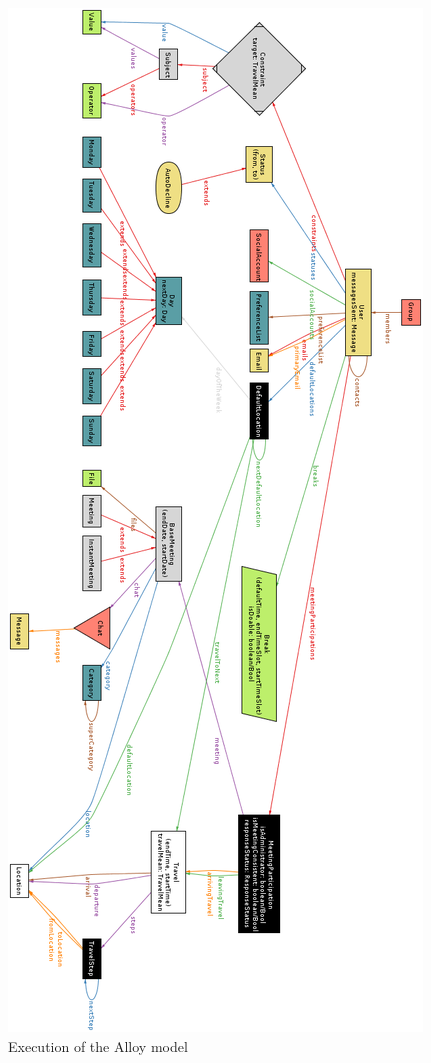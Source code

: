 \begin{figure}
	\vspace*{-0.5cm}
	\centering\includegraphics[height=\textheight]{Images/AlloyMetamodel.png}
	\caption{Execution of the Alloy model}
\end{figure}

